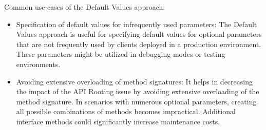 Common use-cases of the Default Values approach:

\begin{itemize}
    \item Specification of default values for infrequently used parameters:
    The Default Values approach is useful for specifying default values for optional parameters that are not frequently
    used by clients deployed in a production environment.
    These parameters might be utilized in debugging modes or testing environments.
    \item Avoiding extensive overloading of method signatures:
    It helps in decreasing the impact of the API Rooting issue by avoiding extensive overloading
    of the method signature.
    In scenarios with numerous optional parameters, creating all possible combinations of methods becomes impractical.
    Additional interface methods could significantly increase maintenance costs.
\end{itemize}

